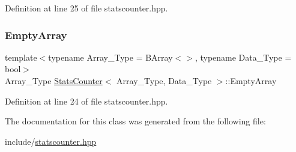 Definition at line 25 of file statscounter.\+hpp.

\mbox{\label{class_stats_counter_a026304bec607994865ba5bb4e18f9104}} 
\subsubsection{\texorpdfstring{Empty\+Array}{EmptyArray}}
{\footnotesize\ttfamily template$<$typename Array\+\_\+\+Type  = B\+Array$<$$>$, typename Data\+\_\+\+Type  = bool$>$ \\
Array\+\_\+\+Type \hyperlink{class_stats_counter}{Stats\+Counter}$<$ Array\+\_\+\+Type, Data\+\_\+\+Type $>$\+::Empty\+Array}



Definition at line 24 of file statscounter.\+hpp.



The documentation for this class was generated from the following file\+:\begin{DoxyCompactItemize}
\item 
include/\hyperlink{statscounter_8hpp}{statscounter.\+hpp}\end{DoxyCompactItemize}
